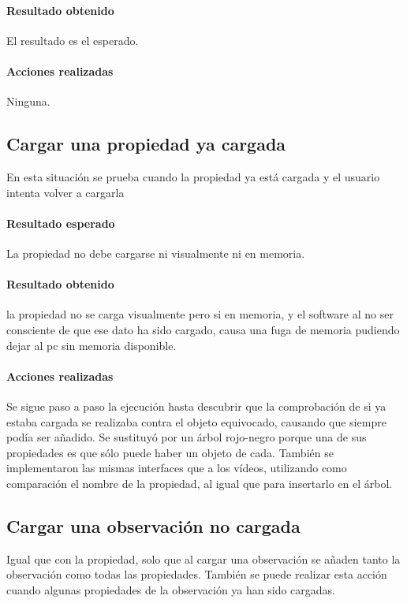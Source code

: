 \paragraph{Resultado obtenido}
El resultado es el esperado.

\paragraph{Acciones realizadas}
Ninguna.

\subsection{Cargar una propiedad ya cargada}
En esta situaci\'on se prueba cuando la propiedad
ya est\'a cargada y el usuario intenta volver a cargarla

\paragraph{Resultado esperado}
La propiedad no debe cargarse ni visualmente ni en memoria.

\paragraph{Resultado obtenido}
la propiedad no se carga visualmente pero si en memoria, y el software
al no ser consciente de que ese dato ha sido cargado, causa una fuga de memoria
pudiendo dejar al pc sin memoria disponible.

\paragraph{Acciones realizadas}
Se sigue paso a paso la ejecuci\'on hasta descubrir que la comprobaci\'on
de si ya estaba cargada se realizaba contra el objeto equivocado, causando que
siempre pod\'ia ser a\~nadido. Se sustituy\'o por un \'arbol rojo-negro
porque una de sus propiedades es que s\'olo puede haber un objeto de cada.
Tambi\'en se implementaron las mismas interfaces que a los v\'ideos, utilizando
como comparaci\'on el nombre de la propiedad, al igual que para insertarlo
en el \'arbol.

\subsection{Cargar una observaci\'on no cargada}
Igual que con la propiedad, solo que al cargar una observaci\'on
se a\~naden tanto la observaci\'on como todas las propiedades. Tambi\'en
se puede realizar esta acci\'on cuando algunas propiedades de la observaci\'on
ya han sido cargadas.

